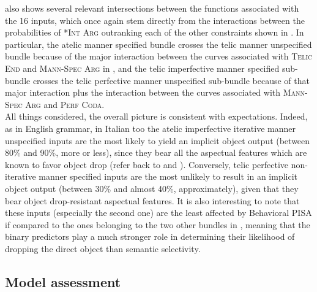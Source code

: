 also shows several relevant intersections between the functions associated with the 16 inputs, which once again stem directly from the interactions between the probabilities of \textsc{*Int Arg} outranking each of the other constraints shown in . In particular, the atelic manner specified bundle crosses the telic manner unspecified bundle because of the major interaction between the curves associated with \textsc{Telic End} and \textsc{Mann-Spec Arg} in , and the telic imperfective manner specified sub-bundle crosses the telic perfective manner unspecified sub-bundle because of that major interaction plus the interaction between the curves associated with \textsc{Mann-Spec Arg} and \textsc{Perf Coda}.\\
All things considered, the overall picture is consistent with expectations. Indeed, as in English grammar, in Italian too the atelic imperfective iterative manner unspecified inputs are the most likely to yield an implicit object output (between 80\% and 90\%, more or less), since they bear all the aspectual features which are known to favor object drop (refer back to  and ). Conversely, telic perfective non-iterative manner specified inputs are the most unlikely to result in an implicit object output (between 30\% and almost 40\%, approximately), given that they bear object drop-resistant aspectual features. It is also interesting to note that these inputs (especially the second one) are the least affected by Behavioral PISA if compared to the ones belonging to the two other bundles in , meaning that the binary predictors play a much stronger role in determining their likelihood of dropping the direct object than semantic selectivity.


\subsection{Model assessment} 


